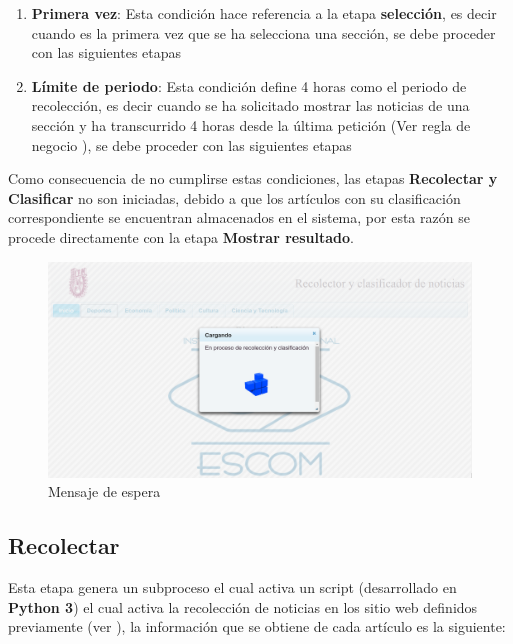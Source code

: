 \begin{enumerate}
	\item \textbf{Primera vez}: Esta condición hace referencia a la etapa \textbf{selección}, es decir cuando es la primera vez que se ha selecciona una sección, se debe proceder con las siguientes etapas

	\item \textbf{Límite de periodo}: Esta condición define 4 horas como el periodo de recolección, es decir cuando se ha solicitado mostrar las noticias de una sección y ha transcurrido 4 horas desde la última petición (Ver regla de negocio ), se debe proceder con las siguientes etapas
\end{enumerate}	

Como consecuencia de no cumplirse estas condiciones, las etapas \textbf{Recolectar y Clasificar} no son iniciadas, debido a que los artículos con su clasificación correspondiente se encuentran almacenados en el sistema, por esta razón se procede directamente con la etapa \textbf{Mostrar resultado}.

\begin{figure}[H]
\centering
\includegraphics[scale=0.29]{imagenes/Capitulo5/mensajeEspera.png}
\caption{Mensaje de espera}
\label{fig:loading}
\end{figure}


\subsection{Recolectar}


Esta etapa genera un subproceso el cual activa un script (desarrollado en \textbf{Python 3}) el cual activa la recolección de noticias en los sitio web definidos previamente (ver ), la información que se obtiene de cada artículo es la siguiente:

